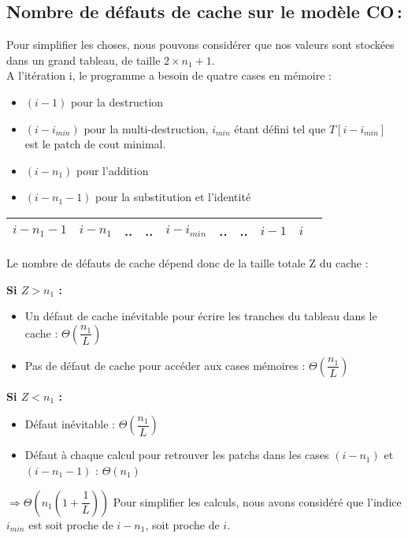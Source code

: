 \documentclass[a4paper, 10pt, french]{article}
\begin{document}
  \subsection{Nombre de défauts de cache sur le modèle CO\,: }
    Pour simplifier les choses, nous pouvons considérer que nos valeurs sont stockées dans un grand tableau, de taille $2 \times n_1 + 1$.\\
    A l'itération i, le programme a besoin de quatre cases en mémoire :
    \begin{itemize}
    \item $(i-1)$ pour la destruction
    \item $(i - i_{min})$ pour la multi-destruction, $i_{min}$ étant défini tel que $T[i-i_{min}]$ est le patch de cout minimal.
    \item $(i - n_1)$ pour l'addition
    \item $(i - n_1 - 1)$ pour la substitution et l'identité
    \end{itemize}

    \begin{tabular}{|c|c|c|c|c|c|c|c|c|c|}
    	\hline

    	 $i - n_1 - 1$ & $i - n_1$  &  .. & .. & $i - i_{min}$ & .. & .. & $i - 1$ & $i$ \\

    	\hline
    \end{tabular}

	Le nombre de défauts de cache dépend donc de la taille totale Z du cache :

	\textbf{Si $Z > n_1$ :}
    \begin{itemize}
		 \item Un défaut de cache inévitable pour écrire les tranches du tableau dans le cache : $\Theta(\dfrac{n_1}{L})$
		 \item Pas de défaut de cache pour accéder aux cases mémoires : $\Theta(\dfrac{n_1}{L})$
     \end{itemize}

	\textbf{Si $Z < n_1$ :}
    \begin{itemize}
	    \item Défaut inévitable : $\Theta(\dfrac{n_1}{L})$
	    \item Défaut à chaque calcul pour retrouver les patchs dans les cases $(i - n_1)$ et  $(i - n_1 - 1)$ : $\Theta(n_1)$
    \end{itemize}

 	$\Rightarrow \Theta(n_1 (1 + \dfrac{1}{L}) )$
 	Pour simplifier les calculs, nous avons considéré que l'indice $i_{min}$ est soit proche de $i - n_1$, soit proche de $i$.
\end{document}
